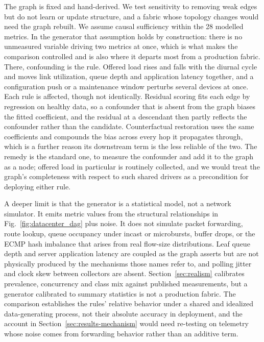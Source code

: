 \documentclass[conference]{IEEEtran}
\begin{document}
The graph is fixed and hand-derived. We test sensitivity to removing weak edges but do not learn or update structure, and a fabric whose topology changes would need the graph rebuilt. We assume causal sufficiency within the 28 modelled metrics. In the generator that assumption holds by construction: there is no unmeasured variable driving two metrics at once, which is what makes the comparison controlled and is also where it departs most from a production fabric. There, confounding is the rule. Offered load rises and falls with the diurnal cycle and moves link utilization, queue depth and application latency together, and a configuration push or a maintenance window perturbs several devices at once. Each rule is affected, though not identically. Residual scoring fits each edge by regression on healthy data, so a confounder that is absent from the graph biases the fitted coefficient, and the residual at a descendant then partly reflects the confounder rather than the candidate. Counterfactual restoration uses the same coefficients and compounds the bias across every hop it propagates through, which is a further reason its downstream term is the less reliable of the two. The remedy is the standard one, to measure the confounder and add it to the graph as a node; offered load in particular is routinely collected, and we would treat the graph's completeness with respect to such shared drivers as a precondition for deploying either rule.

A deeper limit is that the generator is a statistical model, not a network simulator. It emits metric values from the structural relationships in Fig.~\ref{fig:datacenter_dag} plus noise. It does not simulate packet forwarding, route lookup, queue occupancy under incast or microbursts, buffer drops, or the ECMP hash imbalance that arises from real flow-size distributions. Leaf queue depth and server application latency are coupled as the graph asserts but are not physically produced by the mechanisms those names refer to, and polling jitter and clock skew between collectors are absent. Section~\ref{sec:realism} calibrates prevalence, concurrency and class mix against published measurements, but a generator calibrated to summary statistics is not a production fabric. The comparison establishes the rules' relative behavior under a shared and idealized data-generating process, not their absolute accuracy in deployment, and the account in Section~\ref{sec:results-mechanism} would need re-testing on telemetry whose noise comes from forwarding behavior rather than an additive term.
\end{document}
